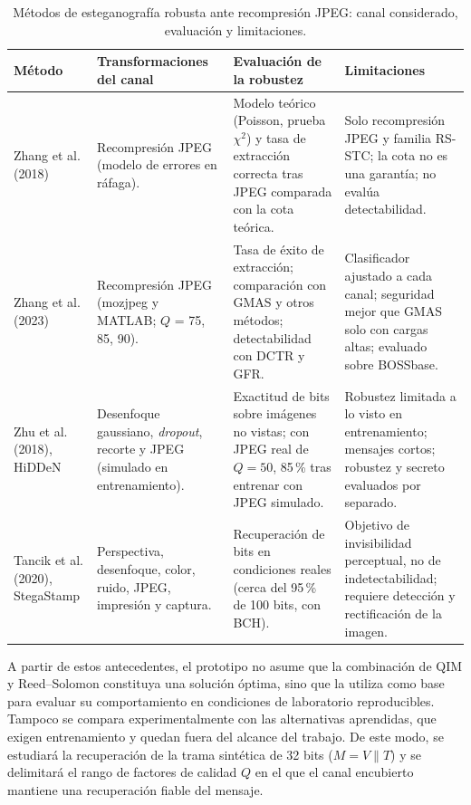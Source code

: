 \documentclass[IB]{TFUOC}%
\begin{document}
\begin{table}[H]
\centering
\scriptsize
\caption{Métodos de esteganografía robusta ante recompresión JPEG: canal considerado, evaluación y limitaciones.}
\label{tab:robustez_metodos}
\begin{tabular}{|p{2.3cm}|p{3.3cm}|p{4.7cm}|p{4.3cm}|}
\hline
\rowcolor{uocnavy}
\color{white}\textbf{Método} &
\color{white}\textbf{Transformaciones del canal} &
\color{white}\textbf{Evaluación de la robustez} &
\color{white}\textbf{Limitaciones} \\
\hline
Zhang et al. (2018) \cite{20} &
Recompresión JPEG (modelo de errores en ráfaga). &
Modelo teórico (Poisson, prueba $\chi^2$) y tasa de extracción correcta tras JPEG comparada con la cota teórica. &
Solo recompresión JPEG y familia RS-STC; la cota no es una garantía; no evalúa detectabilidad. \\
\hline
Zhang et al. (2023) \cite{18} &
Recompresión JPEG (mozjpeg y MATLAB; $Q$ = 75, 85, 90). &
Tasa de éxito de extracción; comparación con GMAS y otros métodos; detectabilidad con DCTR y GFR. &
Clasificador ajustado a cada canal; seguridad mejor que GMAS solo con cargas altas; evaluado sobre BOSSbase. \\
\hline
Zhu et al. (2018), HiDDeN \cite{zhu2018hidden} &
Desenfoque gaussiano, \textit{dropout}, recorte y JPEG (simulado en entrenamiento). &
Exactitud de bits sobre imágenes no vistas; con JPEG real de $Q=50$, 85\,\% tras entrenar con JPEG simulado. &
Robustez limitada a lo visto en entrenamiento; mensajes cortos; robustez y secreto evaluados por separado. \\
\hline
Tancik et al. (2020), StegaStamp \cite{tancik2020stegastamp} &
Perspectiva, desenfoque, color, ruido, JPEG, impresión y captura. &
Recuperación de bits en condiciones reales (cerca del 95\,\% de 100 bits, con BCH). &
Objetivo de invisibilidad perceptual, no de indetectabilidad; requiere detección y rectificación de la imagen. \\
\hline
\end{tabular}
\end{table}

A partir de estos antecedentes, el prototipo no asume que la combinación de QIM y Reed--Solomon constituya una solución óptima, sino que la utiliza como base para evaluar su comportamiento en condiciones de laboratorio reproducibles. Tampoco se compara experimentalmente con las alternativas aprendidas, que exigen entrenamiento y quedan fuera del alcance del trabajo. De este modo, se estudiará la recuperación de la trama sintética de 32 bits ($M = V \parallel T$) y se delimitará el rango de factores de calidad $Q$ en el que el canal encubierto mantiene una recuperación fiable del mensaje.
\end{document}
